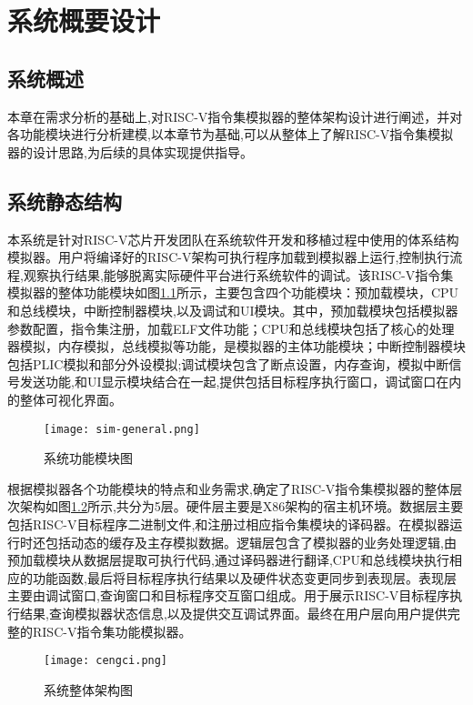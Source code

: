 
\chapter{系统概要设计}

\section{系统概述}
本章在需求分析的基础上,对RISC-V指令集模拟器的整体架构设计进行阐述，并对各功能模块进行分析建模,以本章节为基础,可以从整体上了解RISC-V指令集模拟器的设计思路,为后续的具体实现提供指导。


\section{系统静态结构}
本系统是针对RISC-V芯片开发团队在系统软件开发和移植过程中使用的体系结构模拟器。用户将编译好的RISC-V架构可执行程序加载到模拟器上运行,控制执行流程,观察执行结果,能够脱离实际硬件平台进行系统软件的调试。该RISC-V指令集模拟器的整体功能模块如图\ref{fig:sim_general}所示，主要包含四个功能模块：预加载模块，CPU和总线模块，中断控制器模块,以及调试和UI模块。其中，预加载模块包括模拟器参数配置，指令集注册，加载ELF文件功能；CPU和总线模块包括了核心的处理器模拟，内存模拟，总线模拟等功能，是模拟器的主体功能模块；中断控制器模块包括PLIC模拟和部分外设模拟;调试模块包含了断点设置，内存查询，模拟中断信号发送功能,和UI显示模块结合在一起,提供包括目标程序执行窗口，调试窗口在内的整体可视化界面。
\begin{figure}[H]
  \centering
  \texttt{[image: sim-general.png]}
  \caption{系统功能模块图}
  \label{fig:sim_general}
\end{figure}


根据模拟器各个功能模块的特点和业务需求,确定了RISC-V指令集模拟器的整体层次架构如图\ref{fig:structure}所示,共分为5层。硬件层主要是X86架构的宿主机环境。数据层主要包括RISC-V目标程序二进制文件,和注册过相应指令集模块的译码器。在模拟器运行时还包括动态的缓存及主存模拟数据。逻辑层包含了模拟器的业务处理逻辑,由预加载模块从数据层提取可执行代码,通过译码器进行翻译,CPU和总线模块执行相应的功能函数,最后将目标程序执行结果以及硬件状态变更同步到表现层。表现层主要由调试窗口,查询窗口和目标程序交互窗口组成。用于展示RISC-V目标程序执行结果,查询模拟器状态信息,以及提供交互调试界面。最终在用户层向用户提供完整的RISC-V指令集功能模拟器。


\begin{figure}[H]
  \centering
  \texttt{[image: cengci.png]}
  \caption{系统整体架构图}
  \label{fig:structure}
\end{figure}


